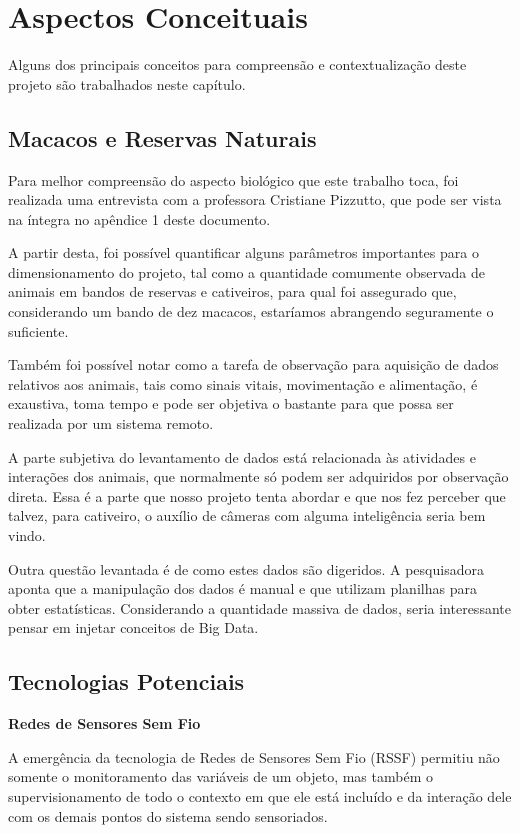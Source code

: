 \chapter{Aspectos Conceituais}
Alguns dos principais conceitos para compreensão e contextualização deste projeto são trabalhados neste capítulo.
	
\section{Macacos e Reservas Naturais}
Para melhor compreensão do aspecto biológico que este trabalho toca, foi realizada uma entrevista com a professora Cristiane Pizzutto, que pode ser vista na íntegra no apêndice 1 deste documento.

A partir desta, foi possível quantificar alguns parâmetros importantes para o dimensionamento do projeto, tal como a quantidade comumente observada de animais em bandos de reservas e cativeiros, para qual foi assegurado que, considerando um bando de dez macacos, estaríamos abrangendo seguramente o suficiente.

Também foi possível notar como a tarefa de observação para aquisição de dados relativos aos animais, tais como sinais vitais, movimentação e alimentação, é exaustiva, toma tempo e pode ser objetiva o bastante para que possa ser realizada por um sistema remoto.

A parte subjetiva do levantamento de dados está relacionada às atividades e interações dos animais, que normalmente só podem ser adquiridos por observação direta. Essa é a parte que nosso projeto tenta abordar e que nos fez perceber que talvez, para cativeiro, o auxílio de câmeras com alguma inteligência seria bem vindo.

Outra questão levantada é de como estes dados são digeridos. A pesquisadora aponta que a manipulação dos dados é manual e que utilizam planilhas para obter estatísticas. Considerando a quantidade massiva de dados, seria interessante pensar em injetar conceitos de Big Data.

\section{Tecnologias Potenciais}
\textbf{Redes de Sensores Sem Fio}

A emergência da tecnologia de Redes de Sensores Sem Fio (RSSF) permitiu não somente o monitoramento das variáveis de um objeto, mas também o supervisionamento de todo o contexto em que ele está incluído e da interação dele com os demais pontos do sistema sendo sensoriados.

